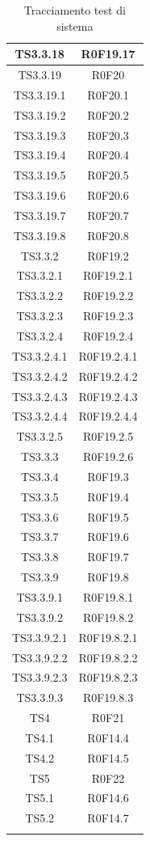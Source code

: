\documentclass[../PianoDiQualifica.tex]{subfiles}
\begin{document}
\begin{longtable}{|c|c|}
		TS3.3.18 & R0F19.17   \\
		\hline
		TS3.3.19 & R0F20   \\
		\hline
		TS3.3.19.1 & R0F20.1   \\
		\hline
		TS3.3.19.2 & R0F20.2   \\
		\hline
		TS3.3.19.3 & R0F20.3   \\
		\hline
		TS3.3.19.4 & R0F20.4   \\
		\hline
		TS3.3.19.5 & R0F20.5   \\
		\hline
		TS3.3.19.6 & R0F20.6   \\
		\hline
		TS3.3.19.7 & R0F20.7   \\
		\hline
		TS3.3.19.8 & R0F20.8   \\
		\hline
		TS3.3.2 & R0F19.2   \\
		\hline
		TS3.3.2.1 & R0F19.2.1   \\
		\hline
		TS3.3.2.2 & R0F19.2.2   \\
		\hline
		TS3.3.2.3 & R0F19.2.3   \\
		\hline
		TS3.3.2.4 & R0F19.2.4   \\
		\hline
		TS3.3.2.4.1 & R0F19.2.4.1   \\
		\hline
		TS3.3.2.4.2 & R0F19.2.4.2   \\
		\hline
		TS3.3.2.4.3 & R0F19.2.4.3   \\
		\hline
		TS3.3.2.4.4 & R0F19.2.4.4   \\
		\hline
		TS3.3.2.5 & R0F19.2.5   \\
		\hline
		TS3.3.3 & R0F19.2.6   \\
		\hline
		TS3.3.4 & R0F19.3   \\
		\hline
		TS3.3.5 & R0F19.4   \\
		\hline
		TS3.3.6 & R0F19.5   \\
		\hline
		TS3.3.7 & R0F19.6   \\
		\hline
		TS3.3.8 & R0F19.7   \\
		\hline
		TS3.3.9 & R0F19.8   \\
		\hline
		TS3.3.9.1 & R0F19.8.1   \\
		\hline
		TS3.3.9.2 & R0F19.8.2   \\
		\hline
		TS3.3.9.2.1 & R0F19.8.2.1   \\
		\hline
		TS3.3.9.2.2 & R0F19.8.2.2   \\
		\hline
		TS3.3.9.2.3 & R0F19.8.2.3   \\
		\hline
		TS3.3.9.3 & R0F19.8.3   \\
		\hline
		TS4 & R0F21   \\
		\hline
		TS4.1 & R0F14.4   \\
		\hline
		TS4.2 & R0F14.5   \\
		\hline
		TS5 & R0F22   \\
		\hline
		TS5.1 & R0F14.6   \\
		\hline
		TS5.2 & R0F14.7   \\
		\hline
		\caption[Tracciamento test di sistema]{Tracciamento test di sistema}
		\label{tabella:TracciamentoTestSistema}
	\end{longtable}
	
\end{document}
